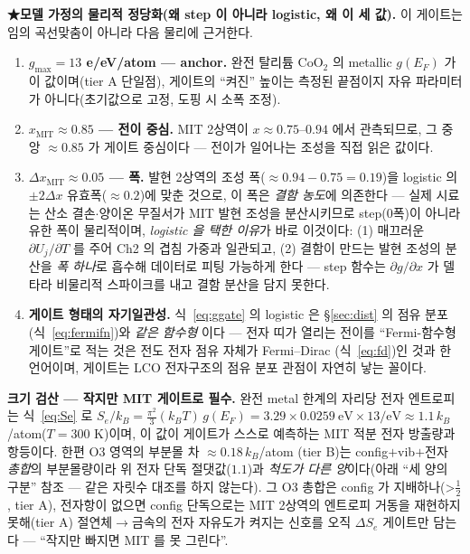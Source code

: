 \documentclass[11pt,a4paper]{article}
\begin{document}
\textbf{★모델 가정의 물리적 정당화(왜 step 이 아니라 logistic, 왜 이 세 값).} 이 게이트는 임의 곡선맞춤이 아니라
다음 물리에 근거한다.
\begin{enumerate}[label=(\roman*),leftmargin=2.2em,itemsep=2pt]
\item \textbf{$g_{\max}=13$ e/eV/atom — anchor.} 완전 탈리튬 $\mathrm{CoO_2}$ 의 metallic $g(E_F)$ 가 이 값이며(tier A 단일점)\cite{motohashi2009}, 게이트의
``켜진'' 높이는 측정된 끝점이지 자유 파라미터가 아니다(초기값으로 고정, 도핑 시 소폭 조정).
\item \textbf{$x_\mathrm{MIT}\approx0.85$ — 전이 중심.} MIT 2상역이 $x\approx0.75$--$0.94$ 에서 관측되므로\cite{menetrier1999,reimers1992},
그 중앙 $\approx0.85$ 가 게이트 중심이다 — 전이가 일어나는 조성을 직접 읽은 값이다.
\item \textbf{$\Delta x_\mathrm{MIT}\approx0.05$ — 폭.} 발현 2상역의 조성 폭($\approx0.94{-}0.75=0.19$)을 logistic 의 $\pm2\Delta x$ 유효폭($\approx0.2$)에 맞춘
것으로, 이 폭은 \emph{결함 농도}에 의존한다 — 실제 시료는 산소 결손$\cdot$양이온 무질서가 MIT 발현 조성을
분산시키므로 step(0폭)이 아니라 유한 폭이 물리적이며, \emph{logistic 을 택한 이유}가 바로 이것이다: (1) 매끄러운
$\partial U_j/\partial T$ 를 주어 Ch2 의 겹침 가중과 일관되고, (2) 결함이 만드는 발현 조성의 분산을 \emph{폭
하나}로 흡수해 데이터로 피팅 가능하게 한다 — step 함수는 $\partial g/\partial x$ 가 델타라 비물리적 스파이크를
내고 결함 분산을 담지 못한다.
\item \textbf{게이트 형태의 자기일관성.} 식~\eqref{eq:ggate} 의 logistic 은 \S\ref{sec:dist} 의 점유 분포(식~\eqref{eq:fermifn})와 \emph{같은 함수형}
이다 — 전자 띠가 열리는 전이를 ``Fermi-함수형 게이트''로 적는 것은 전도 전자 점유 자체가 Fermi--Dirac
(식~\eqref{eq:fd})인 것과 한 언어이며, 게이트는 LCO 전자구조의 점유 분포 관점이 자연히 낳는 꼴이다.
\end{enumerate}

\textbf{크기 검산 — 작지만 MIT 게이트로 필수.} 완전 metal 한계의 자리당 전자 엔트로피는 식~\eqref{eq:Se} 로 $S_e/k_B=\tfrac{\pi^2}{3}(k_BT)\,g(E_F)
=3.29\times0.0259\ \mathrm{eV}\times13/\mathrm{eV}\approx1.1\,k_B$/atom($T{=}300$ K)이며, 이 값이 게이트가
스스로 예측하는 MIT 적분 전자 방출량과 항등이다. 한편 O3 영역의 부분몰 차 $\approx0.18\,k_B$/atom
\cite{reynier2004}(tier B)는 config$+$vib$+$전자 \emph{총합}의 부분몰량이라 위 전자 단독 절댓값($1.1$)과
\emph{척도가 다른 양}이다(아래 ``세 양의 구분'' 참조 — 같은 자릿수 대조를 하지 않는다). 그 O3 총합은 config 가
지배하나(>$\tfrac12$\cite{reynier2004}, tier A), 전자항이 없으면 config 단독으로는 MIT 2상역의 엔트로피 거동을
재현하지 못해\cite{ml2024}(tier A) 절연체$\to$금속의 전자 자유도가 켜지는 신호를 오직 $\Delta S_e$ 게이트만
담는다 — ``작지만 빠지면 MIT 를 못 그린다''.
\end{document}

